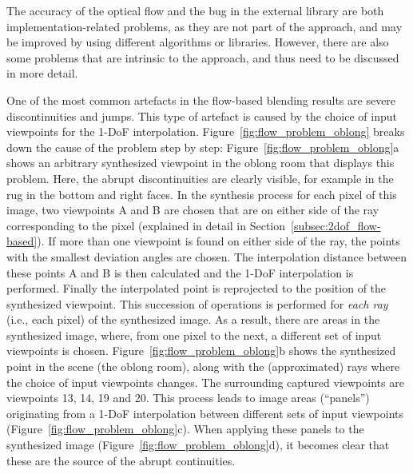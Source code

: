 The accuracy of the optical flow and the bug in the external library are both implementation-related problems, as they are not part of the approach, and may be improved by using different algorithms or libraries. However, there are also some problems that are intrinsic to the approach, and thus need to be discussed in more detail.

One of the most common artefacts in the flow-based blending results are severe discontinuities and jumps. This type of artefact is caused by the choice of input viewpoints for the 1-DoF interpolation. Figure~\ref{fig:flow_problem_oblong} breaks down the cause of the problem step by step: Figure~\ref{fig:flow_problem_oblong}a shows an arbitrary synthesized viewpoint in the oblong room that displays this problem. Here, the abrupt discontinuities are clearly visible, for example in the rug in the bottom and right faces.
In the synthesis process for each pixel of this image, two viewpoints A and B are chosen that are on either side of the ray corresponding to the pixel (explained in detail in Section~\ref{subsec:2dof_flow-based}). If more than one viewpoint is found on either side of the ray, the points with the smallest deviation angles are chosen. The interpolation distance between these points A and B is then calculated and the 1-DoF interpolation is performed. Finally the interpolated point is reprojected to the position of the synthesized viewpoint.
This succession of operations is performed for \emph{each ray} (i.e., each pixel) of the synthesized image. As a result, there are areas in the synthesized image, where, from one pixel to the next, a different set of input viewpoints is chosen.
Figure~\ref{fig:flow_problem_oblong}b shows the synthesized point in the scene (the oblong room), along with the (approximated) rays where the choice of input viewpoints changes. The surrounding captured viewpoints are viewpoints 13, 14, 19 and 20.
This process leads to image areas (``panels'') originating from a 1-DoF interpolation between different sets of input viewpoints (Figure~\ref{fig:flow_problem_oblong}c). When applying these panels to the synthesized image (Figure~\ref{fig:flow_problem_oblong}d), it becomes clear that these are the source of the abrupt continuities.

